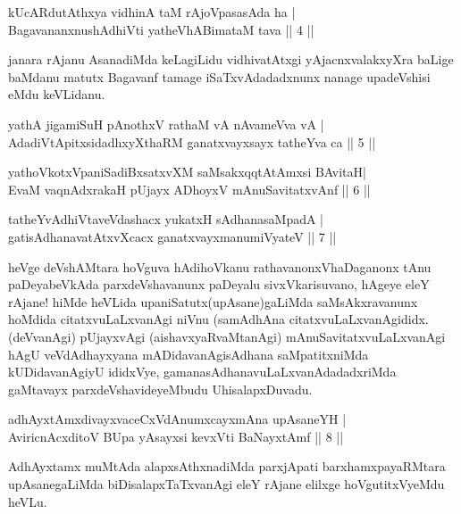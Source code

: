 \begin{shl}
kUcARdutAthxya vidhinA taM rAjoVpasasAda ha |\\
BagavananxnushAdhiVti yatheVhABimataM tava \hfill || 4 || 
\end{shl}

\begin{artha}
janara rAjanu AsanadiMda keLagiLidu vidhivatAtxgi yAjacnxvalakxyXra baLige baMdanu matutx Bagavanf tamage iSaTxvAdadadxnunx nanage upadeVshisi eMdu keVLidanu.
\end{artha}


\begin{shl}
yathA jigamiSuH pAnothxV rathaM vA nAvameVva vA |\\
AdadiVtA\s \s pitxsidadhxyXthaRM ganatxvayxsayx tatheYva ca \hfill || 5 || 
\end{shl}

\begin{shl}
yathoVkotxVpaniSadiBxsatxvXM saMsakxqqtAtAmx\s si BAvitaH|\\
EvaM vaqnAdxrakaH pUjayx ADhoyxV mAnuSavitatxvAnf \hfill || 6 || 
\end{shl}

\begin{shl}
tatheYvAdhiVtaveVdashacx yukatxH sAdhanasaMpadA |\\
gatisAdhanavatAtxvXcacx ganatxvayxmanumiVyateV \hfill || 7 || 
\end{shl}

\begin{artha}
heVge deVshAMtara hoVguva hAdihoVkanu rathavanonxV\break haDaganonx tAnu paDeyabeVkAda parxdeVshavanunx paDeyalu sivxVkarisuvano, hAgeye eleY rAjane! hiMde heVLida upaniSatutx(upAsane)\break gaLiMda saMsAkxravanunx hoMdida citatxvuLaLxvanAgi niVnu (samAdhAna citatxvuLaLxvanAgididx. (deVvanAgi) pUjayxvAgi (aishavxyaRvaMtanAgi) mAnuSavitatxvuLaLxvanAgi hAgU veVdAdhayxyana mADidavanAgi\break sAdhana saMpatitxniMda kUDidavanAgiyU ididxVye, gamanasAdhanavuLaLxvanAdadadxriMda gaMtavayx parxdeVshavideyeMbudu UhisalapxDuvadu.
\end{artha}

\begin{shl}
adhAyxtAmxdivayxvaceCxVdAnumxcayxmAna upAsaneYH |\\
AviricnAcxditoV BUpa yAsayxsi kevxVti BaNayxtAmf \hfill || 8 || 
\end{shl}

\begin{artha}
AdhAyxtamx muMtAda alapxsAthxnadiMda parxjApati barxhamxpayaRMtara upAsanegaLiMda biDisalapxTaTxvanAgi eleY rAjane elilxge hoVgutitxVyeMdu heVLu.
\end{artha}


